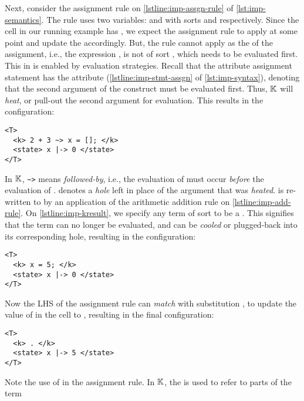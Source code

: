 Next, consider the assignment rule on \autoref{lstline:imp-assgn-rule} of
\autoref{lst:imp-semantics}. The rule uses two variables:  and 
with sorts  and  respectively. Since the 
cell in our running example has , we expect the assignment
rule to apply at some point and update the  accordingly.
But, the rule cannot apply as the \RHS{} of the assignment, i.e., the expression
, is not of sort , which needs to be evaluated
first. This in \K{} is enabled by evaluation strategies.
Recall that the attribute assignment statement has the attribute
 (\autoref{lstline:imp-stmt-assgn} of
\autoref{lst:imp-syntax}), denoting that the second argument of the
construct must be evaluated first. Thus,
$\mathbb{K}$ will \emph{heat}, or pull-out the second
argument for evaluation. This results in the configuration:
\begin{lstlisting}[language=k,style=ksty,frame=single]
<T>
  <k> 2 + 3 ~> x = []; </k>
  <state> x |-> 0 </state>
</T>
\end{lstlisting}
In $\mathbb{K}{}$, \lstinline[style=inlineksty]{~>} means \emph{followed-by}, i.e.,
the evaluation of  must occur \emph{before} the evaluation
of . \inlinek{[]} denotes a \emph{hole} left in place of
the argument that was \emph{heated}.
is re-written to 
by an application of the arithmetic addition rule on
\autoref{lstline:imp-add-rule}. On
\autoref{lstline:imp-kresult},
we specify any term of sort  to be a .
This signifies that the term can no longer be evaluated, and can be \emph{cooled}
or plugged-back into its corresponding hole, resulting in the configuration:
\begin{lstlisting}[language=k,style=ksty,frame=single]
<T>
  <k> x = 5; </k>
  <state> x |-> 0 </state>
</T>
\end{lstlisting}
Now the LHS of the assignment rule can \emph{match} with substitution
, to
update the value of  in the  cell
to , resulting in the final configuration:
\begin{lstlisting}[language=k,style=ksty,frame=single]
<T>
  <k> . </k>
  <state> x |-> 5 </state>
</T>
\end{lstlisting}
Note the use of  in the assignment rule. In $\mathbb{K}{}$,
the  is used to refer to parts of the term
